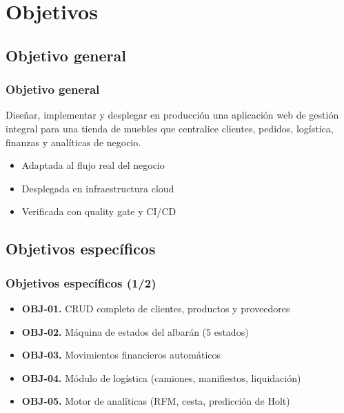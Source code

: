 \documentclass[xcolor=svgnames,aspectratio=169]{beamer}
\begin{document}
\section{Objetivos}

\subsection{Objetivo general}
\begin{frame}
  \frametitle{Objetivo general}
  \begin{block}{}
    Dise\~nar, implementar y desplegar en producci\'on una aplicaci\'on web de
    gesti\'on integral para una tienda de muebles que centralice clientes,
    pedidos, log\'istica, finanzas y anal\'iticas de negocio.
  \end{block}
  \bigskip
  \begin{itemize}
    \item Adaptada al \alert{flujo real} del negocio \smallskip
    \item Desplegada en \alert{infraestructura cloud} \smallskip
    \item Verificada con \alert{quality gate} y CI/CD
  \end{itemize}
\end{frame}

\subsection{Objetivos espec\'ificos}
\begin{frame}
  \frametitle{Objetivos espec\'ificos (1/2)}
  \begin{itemize}
    \item \textbf{OBJ-01.} CRUD completo de clientes, productos y proveedores \smallskip
    \item \textbf{OBJ-02.} M\'aquina de estados del albar\'an (5 estados) \smallskip
    \item \textbf{OBJ-03.} Movimientos financieros autom\'aticos \smallskip
    \item \textbf{OBJ-04.} M\'odulo de log\'istica (camiones, manifiestos, liquidaci\'on) \smallskip
    \item \textbf{OBJ-05.} Motor de anal\'iticas (RFM, cesta, predicci\'on de Holt)
  \end{itemize}
\end{frame}
\end{document}
